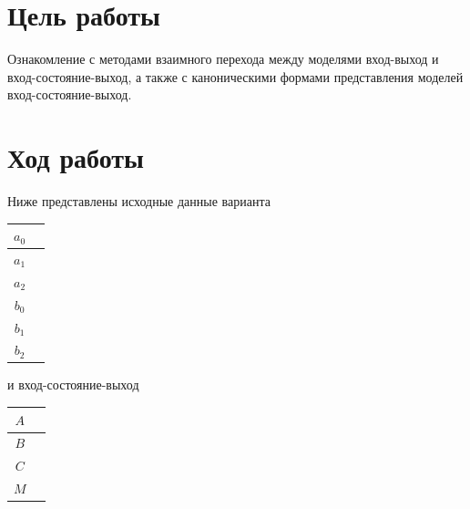 \documentclass[a4paper,12pt,russian]{article} %
\begin{document}
		

	\renewcommand\titleBotRIGHT{
	\spboxmm{100}{70}{70}{30}{lc}{\parbox{70mm}{
			\normalsize{Преподаватель: Чепинский С.А. }\\ 
			\normalsize{Студенты: Французов Р.А.\\  Донцова М.А.}\\
			\normalsize{Группа: R3325}\\
			\normalsize{Вариант: 18}}}}

		\maketitle
		
		\section{Цель работы}
		Ознакомление с методами взаимного перехода между моделями
		вход-выход и вход-состояние-выход, а также с каноническими формами представления
		моделей вход-состояние-выход. 
 \\
		
		\section{Ход работы}
Ниже представлены исходные данные варианта\\
\begin{center}
\begin{tabular}{|c|c|}
	\hline
	$a_0$ &  \\ \hline
	$a_1$ &  \\ \hline
	$a_2$ &  \\ \hline
	$b_0$ &  \\ \hline
	$b_1$ &  \\ \hline
	$b_2$ &  \\ \hline
\end{tabular}
\end{center}
и вход-состояние-выход\\
\begin{center}
	\begin{tabular}{|c|c|}
		\hline
		$A$ & \\ \hline
		$B$ & \\ \hline
		$C$ &  \\ \hline
		$M$ &  \\ \hline
	\end{tabular}
\end{center}
\end{document}
